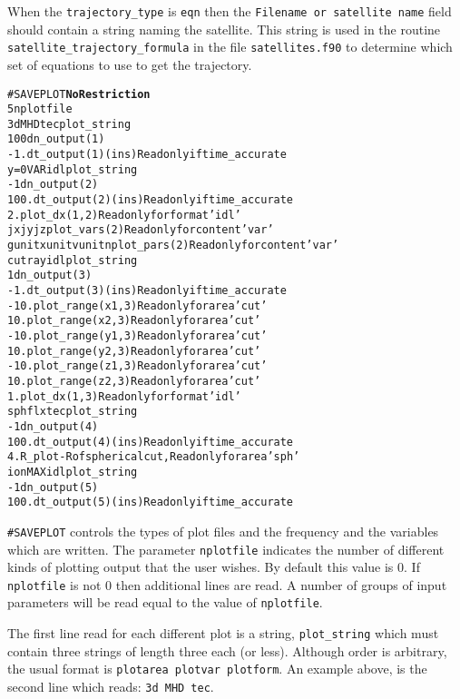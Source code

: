 When the {\tt trajectory\_type} is {\tt eqn} then the {\tt  Filename or satellite name} field
should contain a string naming the satellite.  This string is used in the routine
{\tt satellite\_trajectory\_formula} in the file {\tt satellites.f90} to determine
which set of equations to use to get the trajectory.
\ \ \\


\begin{alltt}
#SAVEPLOT  \hfill {\bf No Restriction}
5                      nplotfile
3d MHD tec             plot_string
100                    dn_output(1)
-1.                    dt_output(1)  (in s) Read only if time_accurate
y=0 VAR idl            plot_string
-1                     dn_output(2)
100.                   dt_output(2)  (in s) Read only if time_accurate
2.                     plot_dx(1,2)  Read only for format 'idl'
jx jy jz               plot_vars(2)  Read only for content 'var'
g unitx unitv unitn    plot_pars(2)  Read only for content 'var'
cut ray idl            plot_string
1                      dn_output(3)
-1.                    dt_output(3)  (in s) Read only if time_accurate
-10.                   plot_range(x1,3) Read only for area 'cut'
10.                    plot_range(x2,3) Read only for area 'cut'
-10.                   plot_range(y1,3) Read only for area 'cut'
10.                    plot_range(y2,3) Read only for area 'cut'
-10.                   plot_range(z1,3) Read only for area 'cut'
10.                    plot_range(z2,3) Read only for area 'cut'
1.                     plot_dx(1,3)     Read only for format 'idl'
sph flx tec            plot_string
-1                     dn_output(4)
100.                   dt_output(4)  (in s) Read only if time_accurate
4.                     R_plot - R of spherical cut, Read only for area 'sph'
ion MAX idl            plot_string
-1                     dn_output(5)
100.                   dt_output(5)  (in s) Read only if time_accurate
\end{alltt}

{\tt \#SAVEPLOT} controls the types of plot files and the  frequency and 
the variables which are written.  
The parameter {\tt nplotfile} indicates the number of different kinds of plotting
output that the user wishes. By default this value is 0. 
If {\tt nplotfile} is not 0 then additional
lines are read.  A number of groups of input parameters will be read equal
to the value of {\tt nplotfile}.  

The first line read for each different plot is a string, {\tt plot\_string}
which must contain three strings of length three each (or less).  Although order is
arbitrary, the usual format is {\tt plotarea plotvar plotform}.  
An example above, is the second line which reads: {\tt 3d  MHD tec}.


